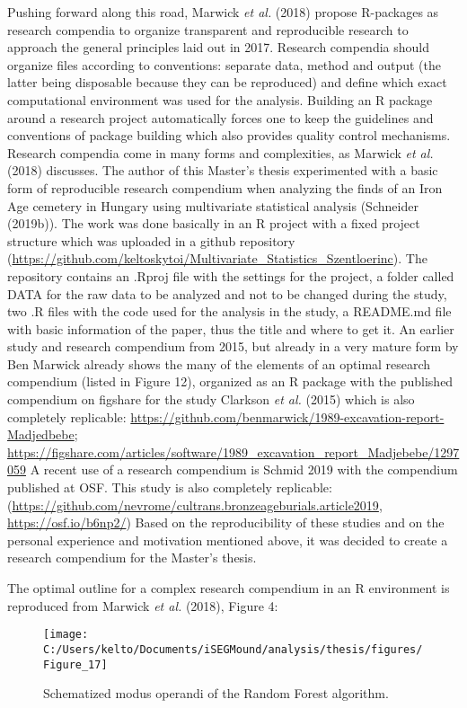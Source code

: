\documentclass[
  12pt,
]{article}
\begin{document}
Pushing forward along this road, Marwick \emph{et al.} (2018) propose R-packages as research compendia to organize transparent and reproducible research to approach the general principles laid out in 2017. Research compendia should organize files according to conventions: separate data, method and output (the latter being disposable because they can be reproduced) and define which exact computational environment was used for the analysis. Building an R package around a research project automatically forces one to keep the guidelines and conventions of package building which also provides quality control mechanisms.
Research compendia come in many forms and complexities, as Marwick \emph{et al.} (2018) discusses. The author of this Master's thesis experimented with a basic form of reproducible research compendium when analyzing the finds of an Iron Age cemetery in Hungary using multivariate statistical analysis (Schneider (2019b)). The work was done basically in an R project with a fixed project structure which was uploaded in a github repository (\url{https://github.com/keltoskytoi/Multivariate_Statistics_Szentloerinc}). The repository contains an .Rproj file with the settings for the project, a folder called DATA for the raw data to be analyzed and not to be changed during the study, two .R files with the code used for the analysis in the study, a README.md file with basic information of the paper, thus the title and where to get it. An earlier study and research compendium from 2015, but already in a very mature form by Ben Marwick already shows the many of the elements of an optimal research compendium (listed in Figure 12), organized as an R package with the published compendium on figshare for the study Clarkson \emph{et al.} (2015) which is also completely replicable: \url{https://github.com/benmarwick/1989-excavation-report-Madjedbebe}; \url{https://figshare.com/articles/software/1989_excavation_report_Madjebebe/1297059}
A recent use of a research compendium is Schmid 2019 with the compendium published at OSF. This study is also completely replicable:
(\url{https://github.com/nevrome/cultrans.bronzeageburials.article2019}, \url{https://osf.io/b6np2/})
Based on the reproducibility of these studies and on the personal experience and motivation mentioned above, it was decided to create a research compendium for the Master's thesis.

The optimal outline for a complex research compendium in an R environment is reproduced from Marwick \emph{et al.} (2018), Figure 4:

\begin{figure}

{\centering \texttt{[image: C:/Users/kelto/Documents/iSEGMound/analysis/thesis/figures/Figure\_17]} 

}

\caption{Schematized modus operandi of the Random Forest algorithm.}\label{fig:Figure17}
\end{figure}
\end{document}
